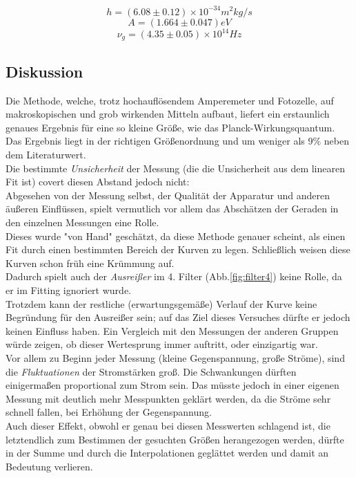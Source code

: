 \documentclass[12pt,a4paper]{article}
\begin{document}
\begin{multicols}{2}


\noindent $$h=(6.08 \pm 0.12)\times 10^{-34} m^2kg/s$$
$$A=(1.664\pm 0.047)eV$$
$$\nu_g=(4.35\pm 0.05)\times 10^{14} Hz$$



\subsection{Diskussion}

Die Methode, welche, trotz hochauflösendem Amperemeter und Fotozelle, auf makroskopischen und grob wirkenden Mitteln aufbaut, liefert ein erstaunlich genaues Ergebnis für eine so kleine Größe, wie das Planck-Wirkungsquantum. Das Ergebnis liegt in der richtigen Größenordnung und um weniger als 9\% neben dem Literaturwert.\\
Die bestimmte \emph{Unsicherheit} der Messung (die die Unsicherheit aus dem linearen Fit ist) covert diesen Abstand jedoch nicht:\\
Abgesehen von der Messung selbst, der Qualität der Apparatur und anderen äußeren Einflüssen, spielt vermutlich vor allem das Abschätzen der Geraden in den einzelnen Messungen eine Rolle.\\
Dieses wurde "von Hand" geschätzt, da diese Methode genauer scheint, als einen Fit durch einen bestimmten Bereich der Kurven zu legen. Schließlich weisen diese Kurven schon früh eine Krümmung auf.\\

Dadurch spielt auch der \emph{Ausreißer} im 4. Filter (Abb.\ref{fig:filter4}) keine Rolle, da er im Fitting ignoriert wurde.\\
Trotzdem kann der restliche (erwartungsgemäße) Verlauf der Kurve  keine Begründung für den Ausreißer sein; auf das Ziel dieses Versuches dürfte er jedoch keinen Einfluss haben. Ein Vergleich mit den Messungen der anderen Gruppen würde zeigen, ob dieser Wertesprung immer auftritt, oder einzigartig war.\\

Vor allem zu Beginn jeder Messung (kleine Gegenspannung, große Ströme), sind die \emph{Fluktuationen} der Stromstärken groß. Die Schwankungen dürften einigermaßen proportional zum Strom sein. Das müsste jedoch in einer eigenen Messung mit deutlich mehr Messpunkten geklärt werden, da die Ströme sehr schnell fallen, bei Erhöhung der Gegenspannung.\\
Auch dieser Effekt, obwohl er genau bei diesen Messwerten schlagend ist, die letztendlich zum Bestimmen der gesuchten Größen herangezogen werden, dürfte in der Summe und durch die Interpolationen geglättet werden und damit an Bedeutung verlieren.\\





\end{multicols}
\end{document}
